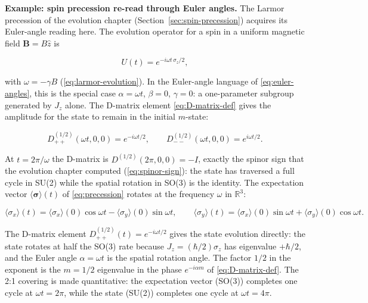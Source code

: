 \medskip\noindent\textbf{Example: spin precession re-read through Euler angles.} The Larmor precession of the evolution chapter (Section~\ref{sec:spin-precession}) acquires its Euler-angle reading here. The evolution operator for a spin in a uniform magnetic field $\bm B = B\hat{z}$ is
\begin{linenomath}
    \begin{equation}
        U(t) = e^{-i\omega t\,\sigma_z/2},
    \end{equation}
\end{linenomath}
with $\omega = -\gamma B$ (\eqref{eq:larmor-evolution}). In the Euler-angle language of \eqref{eq:euler-angles}, this is the special case $\alpha = \omega t$, $\beta = 0$, $\gamma = 0$: a one-parameter subgroup generated by $J_z$ alone. The D-matrix element \eqref{eq:D-matrix-def} gives the amplitude for the state to remain in the initial $m$-state:
\begin{linenomath}
    \begin{equation}
        D^{(1/2)}_{++}(\omega t,0,0) = e^{-i\omega t/2},
        \qquad
        D^{(1/2)}_{--}(\omega t,0,0) = e^{i\omega t/2}.
    \end{equation}
\end{linenomath}
At $t = 2\pi/\omega$ the D-matrix is $D^{(1/2)}(2\pi,0,0) = -I$, exactly the spinor sign that the evolution chapter computed (\eqref{eq:spinor-sign}): the state has traversed a full cycle in SU(2) while the spatial rotation in SO(3) is the identity. The expectation vector $\langle\bm\sigma\rangle(t)$ of \eqref{eq:precession} rotates at the frequency $\omega$ in $\mathbb{R}^3$:
\begin{linenomath}
    \begin{equation}
        \langle\sigma_x\rangle(t) = \langle\sigma_x\rangle(0)\cos\omega t - \langle\sigma_y\rangle(0)\sin\omega t,
        \qquad
        \langle\sigma_y\rangle(t) = \langle\sigma_x\rangle(0)\sin\omega t + \langle\sigma_y\rangle(0)\cos\omega t.
    \end{equation}
\end{linenomath}
The D-matrix element $D^{(1/2)}_{++}(t) = e^{-i\omega t/2}$ gives the state evolution directly: the state rotates at half the SO(3) rate because $J_z = (\hbar/2)\sigma_z$ has eigenvalue $+\hbar/2$, and the Euler angle $\alpha = \omega t$ is the spatial rotation angle. The factor $1/2$ in the exponent is the $m=1/2$ eigenvalue in the phase $e^{-i\alpha m}$ of \eqref{eq:D-matrix-def}. The 2:1 covering is made quantitative: the expectation vector (SO(3)) completes one cycle at $\omega t = 2\pi$, while the state (SU(2)) completes one cycle at $\omega t = 4\pi$.

